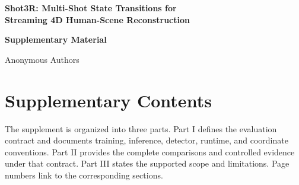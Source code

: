 \begin{center}
  {\Large\bfseries Shot3R: Multi-Shot State Transitions for\\[-1pt]
  Streaming 4D Human-Scene Reconstruction}\par
  \vspace{6pt}
  {\large\bfseries Supplementary Material}\par
  \vspace{3pt}
  {\normalsize Anonymous Authors}
\end{center}

\vspace{8pt}
\section*{Supplementary Contents}

The supplement is organized into three parts. Part I defines the evaluation
contract and documents training, inference, detector, runtime, and coordinate
conventions. Part II provides the complete comparisons and controlled evidence
under that contract. Part III states the supported scope and limitations.
Page numbers link to the corresponding sections.

\begingroup
\small
\setlength{\parindent}{0pt}
\setlength{\parskip}{1.5pt}
\newcommand{\apptocpart}[2]{%
  \vspace{2pt}\textbf{#1}%
  \nobreak\leaders\hbox{\kern0.25em.\kern0.25em}\hfill
  \nobreak\makebox[2em][r]{\textbf{\pageref*{#2}}}\par}
\newcommand{\apptocsection}[3]{%
  \hspace*{1.2em}\makebox[2.4em][l]{\textbf{#1}}\textbf{#2}%
  \nobreak\leaders\hbox{\kern0.25em.\kern0.25em}\hfill
  \nobreak\makebox[2em][r]{\textbf{\pageref*{#3}}}\par}
\newcommand{\apptocsubsection}[3]{%
  \hspace*{3.6em}\makebox[3.4em][l]{#1}#2%
  \nobreak\leaders\hbox{\kern0.25em.\kern0.25em}\hfill
  \nobreak\makebox[2em][r]{\pageref*{#3}}\par}
\newcommand{\apptocsubsubsection}[3]{%
  \hspace*{7.0em}\makebox[4.2em][l]{#1}#2%
  \nobreak\leaders\hbox{\kern0.25em.\kern0.25em}\hfill
  \nobreak\makebox[2em][r]{\pageref*{#3}}\par}

